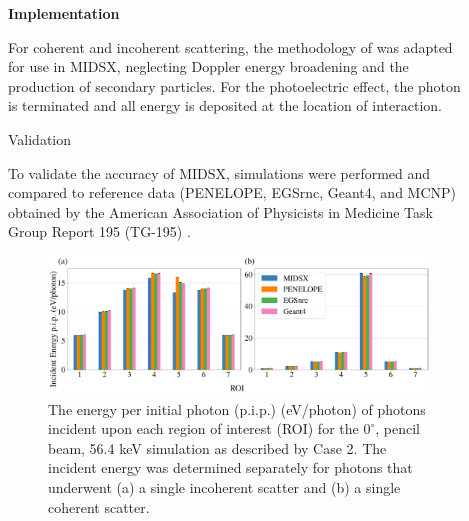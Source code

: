\documentclass[final]{beamer}
\newlength{\sepwidth}
\newlength{\colwidth}
\newcommand{\separatorcolumn}{\begin{column}{\sepwidth}\end{column}}
\begin{document}
\begin{frame}[t]
\begin{columns}[t]
\begin{column}{\colwidth}
  \begin{center}
    \textbf{Implementation}
  \end{center}

  For coherent and incoherent scattering, the methodology of \cite{lund2018implementation} was adapted for use in MIDSX, neglecting Doppler energy broadening and the production of secondary particles. For the photoelectric effect, the photon is terminated and all energy is deposited at the location of interaction.

  \begin{block}{Validation}

    To validate the accuracy of MIDSX, simulations were performed and compared to reference data (PENELOPE, EGSrnc, Geant4, and MCNP) obtained by the American Association of Physicists in Medicine Task Group Report 195 (TG-195) \cite{sechopoulos_monte_2015}.

    \begin{figure}
      \centering
      \includegraphics[width = \colwidth]{ROI_0_deg__pencil_paper_ready_wo_mutiple.pdf}
      \caption{The energy per initial photon (p.i.p.) (eV/photon) of photons incident upon each region of interest (ROI) for the $0^\circ$, pencil beam, 56.4 keV simulation as described by Case 2. The incident energy was determined separately for photons that underwent (a) a single incoherent scatter and (b) a single coherent scatter.}
      \label{fig:ROIPGraph}
    \end{figure}
  \end{block}

\end{column}

\separatorcolumn

\begin{column}{\colwidth}


\end{column}
\end{columns}
\end{frame}
\end{document}
